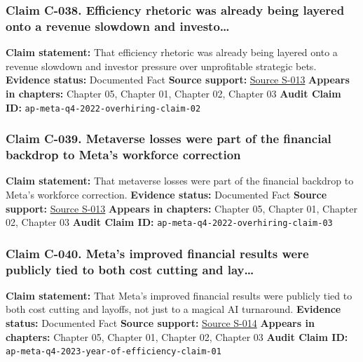 \documentclass[
  american,
  11pt,
  letterpaper,
]{article}
\begin{document}
\subsubsection{Claim C-038. Efficiency rhetoric was already being
layered onto a revenue slowdown and
investo\ldots{}}\label{claim-c-038-efficiency-rhetoric-was-already-being-layered-onto-a-revenue-slowdown-and-investo}

\textbf{Claim statement:} That efficiency rhetoric was already being
layered onto a revenue slowdown and investor pressure over unprofitable
strategic bets. \textbf{Evidence status:} Documented Fact \textbf{Source
support:}
\hyperref[source-s-013-meta-posts-lower-q4-profit-announces-huge-stock-buyback]{Source
S-013} \textbf{Appears in chapters:} Chapter 05, Chapter 01, Chapter 02,
Chapter 03 \textbf{Audit Claim ID:}
\texttt{ap-meta-q4-2022-overhiring-claim-02}

\subsubsection{Claim C-039. Metaverse losses were part of the financial
backdrop to Meta's workforce
correction}\label{claim-c-039-metaverse-losses-were-part-of-the-financial-backdrop-to-meta-s-workforce-correction}

\textbf{Claim statement:} That metaverse losses were part of the
financial backdrop to Meta's workforce correction. \textbf{Evidence
status:} Documented Fact \textbf{Source support:}
\hyperref[source-s-013-meta-posts-lower-q4-profit-announces-huge-stock-buyback]{Source
S-013} \textbf{Appears in chapters:} Chapter 05, Chapter 01, Chapter 02,
Chapter 03 \textbf{Audit Claim ID:}
\texttt{ap-meta-q4-2022-overhiring-claim-03}

\subsubsection{Claim C-040. Meta's improved financial results were
publicly tied to both cost cutting and
lay\ldots{}}\label{claim-c-040-meta-s-improved-financial-results-were-publicly-tied-to-both-cost-cutting-and-lay}

\textbf{Claim statement:} That Meta's improved financial results were
publicly tied to both cost cutting and layoffs, not just to a magical AI
turnaround. \textbf{Evidence status:} Documented Fact \textbf{Source
support:}
\hyperref[source-s-014-meta-posts-sharp-profit-revenue-increase-in-q4-thanks-to-cost-cuts-and-advertising-rebound]{Source
S-014} \textbf{Appears in chapters:} Chapter 05, Chapter 01, Chapter 02,
Chapter 03 \textbf{Audit Claim ID:}
\texttt{ap-meta-q4-2023-year-of-efficiency-claim-01}
\end{document}
